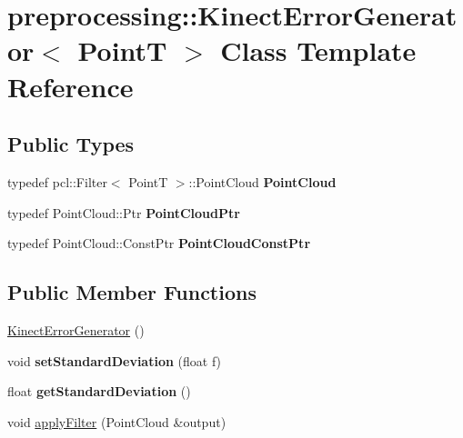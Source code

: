 \hypertarget{classpreprocessing_1_1KinectErrorGenerator}{
\section{preprocessing::KinectErrorGenerator$<$ PointT $>$ Class Template Reference}
\label{classpreprocessing_1_1KinectErrorGenerator}
}
\subsection*{Public Types}
\begin{DoxyCompactItemize}
\item 
\hypertarget{classpreprocessing_1_1KinectErrorGenerator_af22af74dd318d7a961dc3201461f8c11}{
typedef pcl::Filter$<$ PointT $>$::PointCloud {\bfseries PointCloud}}
\label{classpreprocessing_1_1KinectErrorGenerator_af22af74dd318d7a961dc3201461f8c11}

\item 
\hypertarget{classpreprocessing_1_1KinectErrorGenerator_af6b2fa930917c1f410b3dc659ed43d2b}{
typedef PointCloud::Ptr {\bfseries PointCloudPtr}}
\label{classpreprocessing_1_1KinectErrorGenerator_af6b2fa930917c1f410b3dc659ed43d2b}

\item 
\hypertarget{classpreprocessing_1_1KinectErrorGenerator_a08d3d7bf779a3816f4c2b701708ac4c9}{
typedef PointCloud::ConstPtr {\bfseries PointCloudConstPtr}}
\label{classpreprocessing_1_1KinectErrorGenerator_a08d3d7bf779a3816f4c2b701708ac4c9}

\end{DoxyCompactItemize}
\subsection*{Public Member Functions}
\begin{DoxyCompactItemize}
\item 
\hyperlink{classpreprocessing_1_1KinectErrorGenerator_aaea9a80088c10f0859e7d4f9c31050bb}{KinectErrorGenerator} ()
\item 
\hypertarget{classpreprocessing_1_1KinectErrorGenerator_a8b946ee553b370a784da6a6c833bbb8e}{
void {\bfseries setStandardDeviation} (float f)}
\label{classpreprocessing_1_1KinectErrorGenerator_a8b946ee553b370a784da6a6c833bbb8e}

\item 
\hypertarget{classpreprocessing_1_1KinectErrorGenerator_a76290b3036eee5fba60af8d682492233}{
float {\bfseries getStandardDeviation} ()}
\label{classpreprocessing_1_1KinectErrorGenerator_a76290b3036eee5fba60af8d682492233}

\item 
void \hyperlink{classpreprocessing_1_1KinectErrorGenerator_a9424cc0b2e1dcf13118a45fd437ddff4}{applyFilter} (PointCloud \&output)
\end{DoxyCompactItemize}
